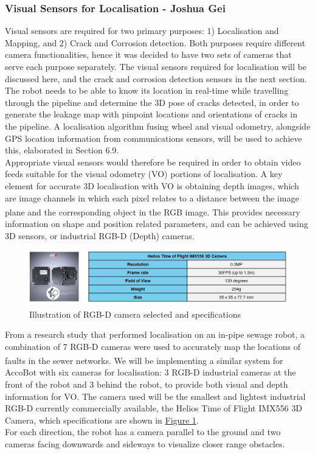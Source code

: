 \documentclass[11pt]{article}		%
\newcommand{\supercite}[1]{\textsuperscript{\cite{#1}}}		%
\newcommand{\figref}[1]{\hyperref[#1]{Figure \ref*{#1}}}    %
\begin{document}
    	        \subsubsection{Visual Sensors for Localisation - Joshua Gei}
	        Visual sensors are required for two primary purposes: 1) Localisation and Mapping, and 2) Crack and Corrosion detection. Both purposes require different camera functionalities, hence it was decided to have two sets of cameras that serve each purpose separately. The visual sensors required for localisation will be discussed here, and the crack and corrosion detection sensors in the next section. 
	        \\ \hspace*{3ex}The robot needs to be able to know its location in real-time while travelling through the pipeline and determine the 3D pose of cracks detected, in order to generate the leakage map with pinpoint locations and orientations of cracks in the pipeline. A localisation algorithm fusing wheel and visual odometry, alongside GPS location information from communications sensors, will be used to achieve this, elaborated in Section 6.9.
            \\ \hspace*{3ex}Appropriate visual sensors would therefore be required in order to obtain video feeds suitable for the visual odometry (VO) portions of localisation. A key element for accurate 3D localisation with VO is obtaining depth images, which are image channels in which each pixel relates to a distance between the image plane and the corresponding object in the RGB image\supercite{visualodometry}. This provides necessary information on shape and position related parameters, and can be achieved using 3D sensors, or industrial RGB-D (Depth) cameras.
	        \begin{figure}[h]
				\centering
				\includegraphics[width=\textwidth]{3dcameratable.jpg}
				\caption{Illustration of RGB-D camera selected and specifications \supercite{camera}}
				\label{robotcamera}
			\end{figure}
	        From a research study that performed localisation on an in-pipe sewage robot, a combination of 7 RGB-D cameras were used to accurately map the locations of faults in the sewer networks\supercite{sewerpaper}. We will be implementing a similar system for AccoBot with six cameras for localisation: 3 RGB-D industrial cameras at the front of the robot and 3 behind the robot, to provide both visual and depth information for VO. The camera used will be the smallest and lightest industrial RGB-D currently commercially available, the Helios Time of Flight IMX556 3D Camera, which specifications are shown in \figref{robotcamera}. 
	        \\ \hspace*{3ex}For each direction, the robot has a camera parallel to the ground and two cameras facing downwards and sideways to visualize closer range obstacles. 
	        
\end{document}
